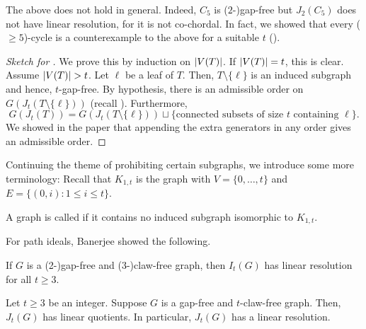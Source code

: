 \documentclass[12pt]{article}
\begin{document}
The above does not hold in general. Indeed, $C_{5}$ is ($2$-)gap-free but $J_{2}(C_{5})$ does not have linear resolution, for it is not co-chordal. In fact, we showed that every ($\ge 5$)-cycle is a counterexample to the above for a suitable $t$ (\cite[Theorem 5.2]{AnanthnarayanJavadekarMaithani}).

\begin{proof}[Sketch for ]
	We prove this by induction on ${\left\lvert V(T) \right\lvert}$. If ${\left\lvert V(T) \right\lvert} = t$, this is clear. Assume ${\left\lvert V(T) \right\lvert} > t$. \newline
	Let $\ell$ be a leaf of $T$. Then, $T \setminus \{\ell\}$ is an induced subgraph and hence, $t$-gap-free. By hypothesis, there is an admissible order on $G(J_{t}(T \setminus \{\ell\}))$ (recall ). Furthermore,
	\begin{equation*} 
		G(J_{t}(T)) = G(J_{t}(T \setminus \{\ell\})) \sqcup \{\text{connected subsets of size $t$ containing $\ell$}\}.
	\end{equation*}
	We showed in the paper that appending the extra generators in any order gives an admissible order.
\end{proof}

Continuing the theme of prohibiting certain subgraphs, we introduce some more terminology: Recall that $K_{1, t}$ is the graph with $V = \{0, \ldots, t\}$ and $E = \{(0, i) : 1 \le i \le t\}$.
\begin{defn}
	A graph is called  if it contains no induced subgraph isomorphic to $K_{1, t}$.
\end{defn}

For path ideals, Banerjee showed the following.
\begin{thm}
	If $G$ is a (2-)gap-free and (3-)claw-free graph, then $I_{t}(G)$ has linear resolution for all $t \ge 3$.
\end{thm}

\begin{thm}
	Let $t \ge 3$ be an integer. Suppose $G$ is a gap-free and $t$-claw-free graph. Then, $J_{t}(G)$ has linear quotients. In particular, $J_{t}(G)$ has a linear resolution.
\end{thm}

\printbibliography
\end{document}

